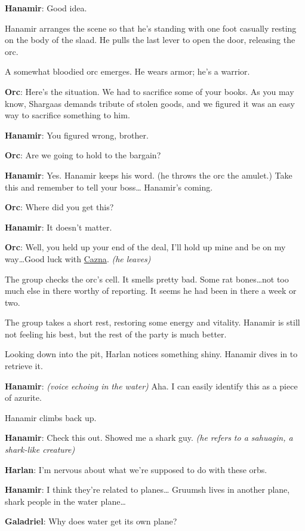 \documentclass[smalldemyvopaper,11pt,twoside,onecolumn,openright,extrafontsizes]{memoir}
\begin{document}
\textbf{Hanamir}: Good idea.

Hanamir arranges the scene so that he's standing with one foot casually
resting on the body of the slaad. He pulls the last lever to open the
door, releasing the orc.

A somewhat bloodied orc emerges. He wears armor; he's a warrior.

\textbf{Orc}: Here's the situation. We had to sacrifice some of your
books. As you may know, Shargaas demands tribute of stolen goods, and we
figured it was an easy way to sacrifice something to him.

\textbf{Hanamir}: You figured wrong, brother.

\textbf{Orc}: Are we going to hold to the bargain?

\textbf{Hanamir}: Yes. Hanamir keeps his word. (he throws the orc the
amulet.) Take this and remember to tell your boss\ldots{} Hanamir's
coming.

\textbf{Orc}: Where did you get this?

\textbf{Hanamir}: It doesn't matter.

\textbf{Orc}: Well, you held up your end of the deal, I'll hold up mine
and be on my way\ldots Good luck with \href{/characters/cazna/}{Cazna}.
\emph{(he leaves)}

The group checks the orc's cell. It smells pretty bad. Some rat
bones\ldots not too much else in there worthy of reporting. It seems he
had been in there a week or two.

The group takes a short rest, restoring some energy and vitality.
Hanamir is still not feeling his best, but the rest of the party is much
better.

Looking down into the pit, Harlan notices something shiny. Hanamir dives
in to retrieve it.

\textbf{Hanamir}: \emph{(voice echoing in the water)} Aha. I can easily
identify this as a piece of azurite.

Hanamir climbs back up.

\textbf{Hanamir}: Check this out. Showed me a shark guy. \emph{(he
refers to a sahuagin, a shark-like creature)}

\textbf{Harlan}: I'm nervous about what we're supposed to do with these
orbs.

\textbf{Hanamir}: I think they're related to planes\ldots{} Gruumsh
lives in another plane, shark people in the water plane\ldots{}

\textbf{Galadriel}: Why does water get its own plane?
\end{document}
